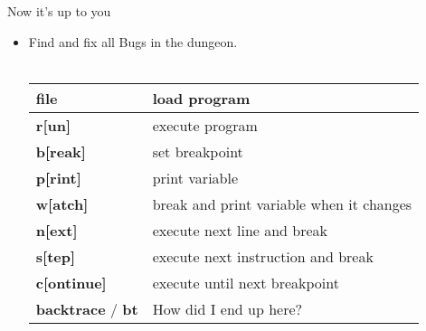 \begin{frame}{Now it's up to you}
	\begin{itemize}
		\item Find and fix all Bugs in the dungeon.\\\ \\
		\begin{tabular}{|l|l|}
			\hline
			\textbf{file} & load program\\\hline
			\textbf{r[un]} & execute program\\\hline
			\textbf{b[reak]} & set breakpoint\\\hline
			\textbf{p[rint]} & print variable\\\hline
			\textbf{w[atch]} & break and print variable when it changes\\\hline
			\textbf{n[ext]} & execute next line and break\\\hline
			\textbf{s[tep]} & execute next instruction and break\\\hline
			\textbf{c[ontinue]} & execute until next breakpoint\\\hline
			\textbf{backtrace} / \textbf{bt} & How did I end up here?\\\hline
		\end{tabular}
	\end{itemize}
\end{frame}

